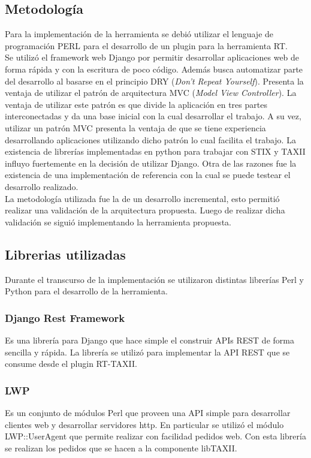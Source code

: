 \subsection{Metodología}
Para la implementación de la herramienta se debió utilizar el lenguaje de programación PERL para el desarrollo de un plugin para la herramienta RT.\\
	\bigskip
Se utilizó el framework web Django por permitir desarrollar aplicaciones web de forma rápida y con la escritura de poco código. Además busca automatizar parte del desarrollo al basarse en el principio DRY (\textit{Don’t Repeat Yourself}). Presenta la ventaja de utilizar el patrón de arquitectura MVC (\textit{Model View Controller}). La ventaja de utilizar este patrón es que divide la aplicación en tres partes interconectadas y da una base inicial con la cual desarrollar el trabajo. A su vez, utilizar un patrón MVC presenta la ventaja de que se tiene experiencia desarrollando aplicaciones utilizando dicho patrón lo cual facilita el trabajo.
La existencia de librerías implementadas en python para trabajar con STIX y TAXII influyo fuertemente en la decisión de utilizar Django. Otra de las razones fue la existencia de una implementación de referencia con la cual se puede testear el desarrollo realizado.\\
	\bigskip
La metodología utilizada fue la de un desarrollo incremental, esto permitió realizar una validación de la arquitectura propuesta. Luego de realizar dicha validación se siguió implementando la herramienta propuesta.

\subsection{Librerias utilizadas}
Durante el transcurso de la implementación se utilizaron distintas librerías Perl y Python para el desarrollo de la herramienta.

\subsubsection{Django Rest Framework}
Es una librería para Django que hace simple el construir APIs REST de forma sencilla y rápida. La librería se utilizó para implementar la API REST que se consume desde el plugin RT-TAXII.

\subsubsection{LWP}
Es un conjunto de módulos Perl que proveen una API simple para desarrollar clientes web y desarrollar servidores http. En particular se utilizó el módulo LWP::UserAgent que permite realizar con facilidad pedidos web.
Con esta librería se realizan los pedidos que se hacen a la componente  libTAXII.

